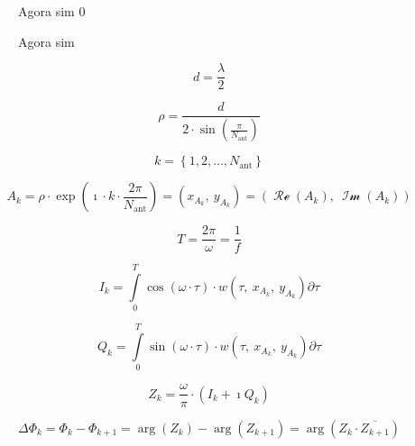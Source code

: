 \begin{figure}[H]
    \centering
    
    \caption{Agora sim 0}
\end{figure}

\begin{figure}[H]
    \centering
    
    \caption{Agora sim}
\end{figure}


\begin{equation} %
    d = \frac{\lambda}{2}
\end{equation}

\begin{equation} %
	\rho = \frac{d}{2\cdot \sin\left(\frac{\pi}{N_\text{ant}}\right)}
\end{equation}

\begin{equation} %
	k = \left\{1, 2, \dotsc, N_\text{ant}\right\}
\end{equation}

\begin{equation} %
	A_k =
    \rho \cdot \exp\left(\imath\cdot k \cdot \frac{2\pi}{N_\text{ant}}\right) =
    \left( x_{A_k},~ y_{A_k} \right) =
    \left( \operatorname{\mathcal{Re}}\left( A_k \right), ~\operatorname{\mathcal{Im}}\left( A_k \right) \right)
\end{equation}

\begin{equation} %
    T = \frac{2\pi}{\omega} = \frac{1}{f}
\end{equation}

\begin{equation} %
    I_k = \int\limits_0^T \cos\left(\omega\cdot\tau\right) \cdot w\left( \tau, ~x_{A_k}, ~y_{A_k} \right) \partial \tau
\end{equation}

\begin{equation} %
    Q_k = \int\limits_0^T \sin\left(\omega\cdot\tau\right) \cdot w\left( \tau, ~x_{A_k}, ~y_{A_k} \right) \partial \tau
\end{equation}

\begin{equation} %
    Z_k = \frac{\omega}{\pi}\cdot\left(I_k + \imath Q_k\right)
\end{equation}

\begin{equation} %
    \Delta\Phi_{k} =
    \Phi_{k} - \Phi_{k+1} =
    \arg\left(Z_{k}\right) - \arg\left(Z_{k+1}\right) =
    \arg\left(Z_{k} \cdot \overline{Z_{k+1}}\right)
\end{equation}

